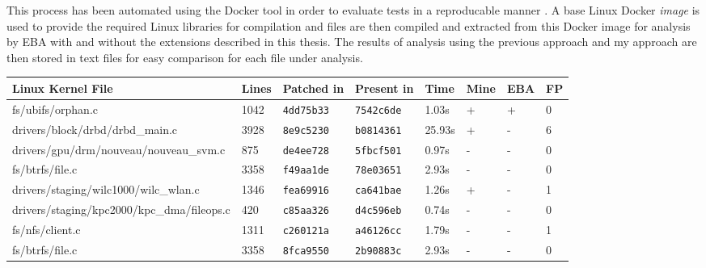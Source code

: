 \newpar This process has been automated using the Docker tool in order to evaluate tests in a reproducable manner \cite{docker}. A base Linux Docker \textit{image} is used to provide the required Linux libraries for compilation and files are then compiled and extracted from this Docker image for analysis by EBA with and without the extensions described in this thesis. The results of analysis using the previous approach and my approach are then stored in text files for easy comparison for each file under analysis. 

\begin{table}[H]
    \centering
    \setlength{\tabcolsep}{5pt}
    \renewcommand{\arraystretch}{1.25}
    \scriptsize
    \begin{tabular}{llllllll}
    \textbf{Linux Kernel File}                    & \textbf{Lines} & \textbf{Patched in} & \textbf{Present in} & \textbf{Time} & \textbf{Mine} & \textbf{EBA} & \textbf{FP} \\
    \hline
    fs/ubifs/orphan.c                             & 1042           & \texttt{4dd75b33}   & \texttt{7542c6de}   & 1.03s         & +             & +            & 0           \\
    drivers/block/drbd/drbd\_main.c               & 3928           & \texttt{8e9c5230}   & \texttt{b0814361}   & 25.93s        & +             & -            & 6           \\
    drivers/gpu/drm/nouveau/nouveau\_svm.c        & 875            & \texttt{de4ee728}   & \texttt{5fbcf501}   & 0.97s         & -             & -            & 0           \\
    fs/btrfs/file.c                               & 3358           & \texttt{f49aa1de}   & \texttt{78e03651}   & 2.93s         & -             & -            & 0           \\
    drivers/staging/wilc1000/wilc\_wlan.c         & 1346           & \texttt{fea69916}   & \texttt{ca641bae}   & 1.26s         & +             & -            & 1           \\
    drivers/staging/kpc2000/kpc\_dma/fileops.c    & 420            & \texttt{c85aa326}   & \texttt{d4c596eb}   & 0.74s         & -             & -            & 0           \\
    fs/nfs/client.c                               & 1311           & \texttt{c260121a}   & \texttt{a46126cc}   & 1.79s         & -             & -            & 1           \\
    fs/btrfs/file.c                               & 3358           & \texttt{8fca9550}   & \texttt{2b90883c}   & 2.93s         & -             & -            & 0           \\

\end{tabular}
\end{table}
